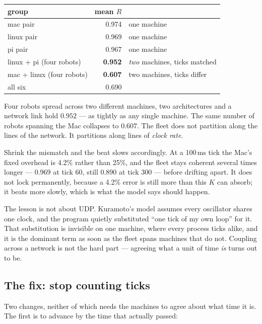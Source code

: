 \begin{center}
\footnotesize
\begin{tabular}{lrl}
\toprule
\textbf{group} & \textbf{mean $R$} & \\
\midrule
mac pair                        & 0.974 & one machine\\
linux pair                      & 0.969 & one machine\\
pi pair                         & 0.967 & one machine\\
linux + pi (four robots)        & \textbf{0.952} & \emph{two} machines, ticks matched\\
mac + linux (four robots)       & \textbf{0.607} & two machines, ticks differ\\
all six                         & 0.690 & \\
\bottomrule
\end{tabular}
\end{center}

Four robots spread across two different machines, two architectures and a
network link hold $0.952$ --- as tightly as any single machine. The same
number of robots spanning the Mac collapses to $0.607$. The fleet does not
partition along the lines of the network. It partitions along lines of
\emph{clock rate}.

Shrink the mismatch and the beat slows accordingly. At a 100\,ms tick the
Mac's fixed overhead is 4.2\% rather than 25\%, and the fleet stays coherent
several times longer --- $0.969$ at tick 60, still $0.890$ at tick 300 ---
before drifting apart. It does not lock permanently, because a 4.2\% error is
still more than this $K$ can absorb; it beats more slowly, which is what the
model says should happen.

The lesson is not about UDP. Kuramoto's model assumes every oscillator shares
one clock, and the program quietly substituted ``one tick of my own loop'' for
it. That substitution is invisible on one machine, where every process ticks
alike, and it is the dominant term as soon as the fleet spans machines that do
not. Coupling across a network is not the hard part --- agreeing what a
unit of time \emph{is} turns out to be.

\subsection{The fix: stop counting ticks}
\label{sec:swarmfix}

Two changes, neither of which needs the machines to agree about what time it
is. The first is to advance by the time that actually passed:

